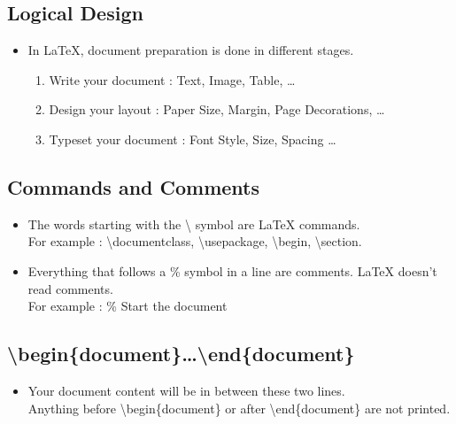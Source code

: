 \documentclass{article}
\begin{document}
\subsection{Logical Design}
\begin{itemize}
	\item In \LaTeX{}, document preparation is done in different stages.
		\begin{enumerate}
			\item Write your document : Text, Image, Table, \dots
			\item Design your layout  : Paper Size, Margin, Page Decorations, \dots
			\item Typeset your document : Font Style, Size, Spacing \dots
		\end{enumerate}
\end{itemize}

\subsection{Commands and Comments}
\begin{itemize}
	\item The words starting with the \textbackslash{} symbol are \LaTeX{} commands.\\ For example : \textbackslash{}documentclass, \textbackslash{}usepackage, \textbackslash{}begin, \textbackslash{}section.
	\item Everything that follows a \% symbol in a line are comments. \LaTeX{} doesn't read comments.\\ For example : \% Start the document
\end{itemize}

\subsection{\textbackslash{}begin\{document\}\dots\textbackslash{}end\{document\}}
\begin{itemize}
	\item Your document content will be in between these two lines.\\ Anything before \textbackslash{}begin\{document\} or after \textbackslash{}end\{document\} are not printed.
\end{itemize}
\end{document}
